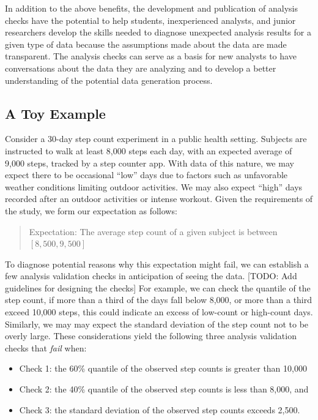 \documentclass[
  12pt,
]{interact}
\providecommand{\tightlist}{%
  \setlength{\itemsep}{0pt}\setlength{\parskip}{0pt}}
\begin{document}
In addition to the above benefits, the development and publication of
analysis checks have the potential to help students, inexperienced
analysts, and junior researchers develop the skills needed to diagnose
unexpected analysis results for a given type of data because the
assumptions made about the data are made transparent. The analysis
checks can serve as a basis for new analysts to have conversations about
the data they are analyzing and to develop a better understanding of the
potential data generation process.

\subsection{A Toy Example}\label{sec-toy}

Consider a 30-day step count experiment in a public health setting.
Subjects are instructed to walk at least 8,000 steps each day, with an
expected average of 9,000 steps, tracked by a step counter app. With
data of this nature, we may expect there to be occasional ``low'' days
due to factors such as unfavorable weather conditions limiting outdoor
activities. We may also expect ``high'' days recorded after an outdoor
activities or intense workout. Given the requirements of the study, we
form our expectation as follows:

\begin{quote}
Expectation: The average step count of a given subject is between
\([8,500, 9,500]\)
\end{quote}

To diagnose potential reasons why this expectation might fail, we can
establish a few analysis validation checks in anticipation of seeing the
data. {[}TODO: Add guidelines for designing the checks{]} For example,
we can check the quantile of the step count, if more than a third of the
days fall below 8,000, or more than a third exceed 10,000 steps, this
could indicate an excess of low-count or high-count days. Similarly, we
may may expect the standard deviation of the step count not to be overly
large. These considerations yield the following three analysis
validation checks that \emph{fail} when:

\begin{itemize}
\tightlist
\item
  Check 1: the 60\% quantile of the observed step counts is greater than
  10,000
\item
  Check 2: the 40\% quantile of the observed step counts is less than
  8,000, and
\item
  Check 3: the standard deviation of the observed step counts exceeds
  2,500.
\end{itemize}
\end{document}
